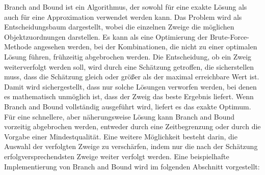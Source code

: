 Branch and Bound ist ein Algorithmus, der sowohl für eine exakte Lösung als auch für eine Approximation verwendet werden kann. Das Problem wird als Entscheidungsbaum dargestellt, wobei die einzelnen Zweige die möglichen Objektzuordnungen darstellen. Es kann als eine Optimierung der Brute-Force-Methode angesehen werden, bei der Kombinationen, die nicht zu einer optimalen Lösung führen, frühzeitig abgebrochen werden. Die Entscheidung, ob ein Zweig weiterverfolgt werden soll, wird durch eine Schätzung getroffen, die sicherstellen muss, dass die Schätzung gleich oder größer als der maximal erreichbare Wert ist. Damit wird sichergestellt, dass nur solche Lösungen verworfen werden, bei denen es mathematisch unmöglich ist, dass der Zweig das beste Ergebnis liefert. Wenn Branch and Bound vollständig ausgeführt wird, liefert es das exakte Optimum. Für eine schnellere, aber näherungsweise Lösung kann Branch and Bound vorzeitig abgebrochen werden, entweder durch eine Zeitbegrenzung oder durch die Vorgabe einer Mindestqualität. Eine weitere Möglichkeit besteht darin, die Auswahl der verfolgten Zweige zu verschärfen, indem nur die nach der Schätzung erfolgversprechendsten Zweige weiter verfolgt werden. Eine beispielhafte Implementierung von Branch and Bound wird im folgenden Abschnitt vorgestellt:

